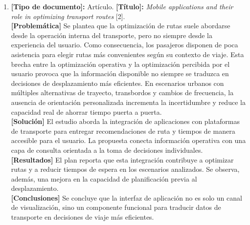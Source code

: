 \begin{enumerate}
    \item \textbf{[Tipo de documento]:} Artículo. \textbf{[Título]:} \textit{Mobile applications and their role in optimizing transport routes} [2].\\
    \textbf{[Problemática]} Se plantea que la optimizaci\'{o}n de rutas suele abordarse desde la operaci\'{o}n interna del transporte, pero no siempre desde la experiencia del usuario. Como consecuencia, los pasajeros disponen de poca asistencia para elegir rutas m\'{a}s convenientes seg\'{u}n su contexto de viaje. Esta brecha entre la optimizaci\'{o}n operativa y la optimizaci\'{o}n percibida por el usuario provoca que la informaci\'{o}n disponible no siempre se traduzca en decisiones de desplazamiento m\'{a}s eficientes. En escenarios urbanos con m\'{u}ltiples alternativas de trayecto, transbordos y cambios de frecuencia, la ausencia de orientaci\'{o}n personalizada incrementa la incertidumbre y reduce la capacidad real de ahorrar tiempo puerta a puerta.\\
    \textbf{[Solución]} El estudio aborda la integración de aplicaciones con plataformas de transporte para entregar recomendaciones de ruta y tiempos de manera accesible para el usuario. La propuesta conecta información operativa con una capa de consulta orientada a la toma de decisiones individuales.\\
    \textbf{[Resultados]} El plan reporta que esta integración contribuye a optimizar rutas y a reducir tiempos de espera en los escenarios analizados. Se observa, además, una mejora en la capacidad de planificación previa al desplazamiento.\\
    \textbf{[Conclusiones]} Se concluye que la interfaz de aplicación no es solo un canal de visualización, sino un componente funcional para traducir datos de transporte en decisiones de viaje más eficientes.


\end{enumerate}
